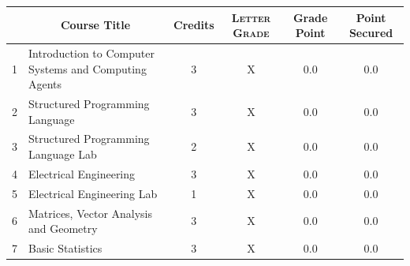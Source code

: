 \documentclass[11pt]{article}
\newcommand*{\numtwo}[1]{\pgfmathprintnumber[
                    fixed, precision=2, fixed zerofill=true]{#1}}
\begin{document}
                \begin{center}
                    \renewcommand{\arraystretch}{1.08}
                    
                \begin{tabular}{|c|l|c|>{\scshape}c|c|c|}
                \hline  \rule[-1ex]{0pt}{3.5ex} {\centering{\bf Course Code}} &  \multicolumn{1}{c|}{\textbf{Course Title}}  & {\bf Credits} & {\bf Letter Grade} & {\bf Grade Point} & {\bf Point Secured}  \\ 
                \hline   1 &  Introduction to Computer Systems and Computing Agents		 & 3 & X & 0.0 & 0.0 \\ %
                \hline   2 &  Structured Programming Language		 & 3 & X & 0.0 & 0.0 \\ %
                \hline   3 &  Structured Programming Language Lab		 & 2 & X & 0.0 & 0.0 \\ %
                \hline   4 &  Electrical Engineering		 & 3 & X & 0.0 & 0.0 \\ %
                \hline   5 &  Electrical Engineering Lab		 & 1 & X & 0.0 & 0.0 \\ %
                \hline   6 &  Matrices, Vector Analysis and Geometry		 & 3 & X & 0.0 & 0.0 \\ %
                \hline   7 &  Basic Statistics		 & 3 & X & 0.0 & 0.0 \\ %

\hline                %
                \end{tabular}
                \end{center}
                \renewcommand{\arraystretch}{1.03}
\end{document}
